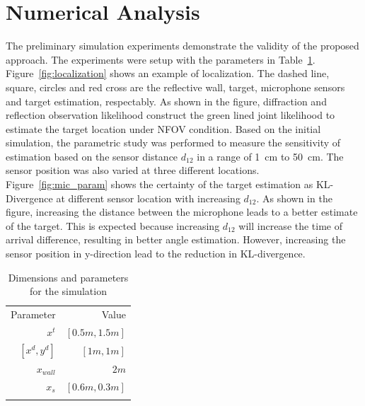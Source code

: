 \documentclass[letterpaper, 10 pt, conference]{ieeeconf}  %
\begin{document}

\section{Numerical Analysis}
The preliminary simulation experiments demonstrate the validity of the proposed approach. The experiments were setup with the parameters in Table~\ref{tab:sim_parameter}.
Figure~\ref{fig:localization} shows an example of localization. The dashed line, square, circles and red cross are the reflective wall, target, microphone sensors and target estimation, respectably. As shown in the figure, diffraction and reflection observation likelihood construct the green lined joint likelihood to estimate the target location under NFOV condition.
Based on the initial simulation, the parametric study was performed to measure the sensitivity of estimation based on the sensor distance $d_{12}$ in a range of 1~cm to 50~cm. The sensor position was also varied at three different locations. Figure~\ref{fig:mic_param} shows the certainty of the target estimation as KL-Divergence at different sensor location with increasing $d_{12}$. As shown in the figure, increasing the distance between the microphone leads to a better estimate of the target. This is expected because increasing $d_{12}$ will increase the time of arrival difference, resulting in better angle estimation. However, increasing the sensor position in y-direction lead to the reduction in KL-divergence.



\begin{table}[h]
    \centering \caption{Dimensions and parameters for the simulation}
    \label{tab:sim_parameter}
    \begin{tabular}{r|r}
        \hline\noalign{\smallskip}
        Parameter & Value \\
         \noalign{\smallskip}\hline\noalign{\smallskip}
         $x^t$ & $[0.5m, 1.5m]$ \\
         $[x^d, y^d]$ & $[1m, 1m]$ \\
         $x_{wall}$ & $2m$\\
         $x_s$ & $[0.6m,0.3m]$\\
        \noalign{\smallskip}\hline\noalign{\smallskip}
     \end{tabular}
\end{table}
\end{document}
